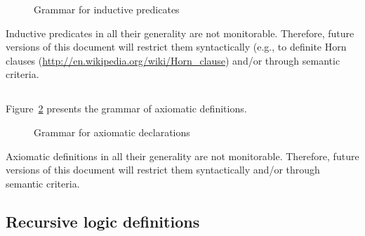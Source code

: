 \begin{figure}[htbp]
  \caption{Grammar for inductive predicates}
\label{fig:gram:inductive}
\end{figure}

Inductive predicates in all their generality are not monitorable. Therefore,
future versions of this document will restrict them syntactically (e.g., to
definite Horn clauses (\url{http://en.wikipedia.org/wiki/Horn_clause}) and/or
through semantic criteria.


\subsection{}
\label{sec:axiomatic}
\experimental

\nodiff

Figure~\ref{fig:gram:logicdecl} presents the grammar of axiomatic definitions.

\begin{figure}[htbp]
  \caption{Grammar for axiomatic declarations}
\label{fig:gram:logicdecl}
\end{figure}

Axiomatic definitions in all their generality are not monitorable. Therefore,
future versions of this document will restrict them syntactically and/or
through semantic criteria.


\subsection{}
\label{sec:polym-logic-types}
\nodiff


\subsection{Recursive logic definitions}
\nodiff

